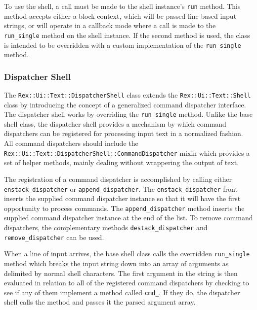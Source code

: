 \documentclass{report}
\begin{document}
\par
To use the shell, a call must be made to the shell instance's
\texttt{run} method.  This method accepts either a block context,
which will be passed line-based input strings, or will operate in a
callback mode where a call is made to the \texttt{run\_single}
method on the shell instance.  If the second method is used, the
class is intended to be overridden with a custom implementation of
the \texttt{run\_single} method.

            \subsubsection{Dispatcher Shell}

\par
The \texttt{Rex::Ui::Text::DispatcherShell} class extends the
\texttt{Rex::Ui::Text::Shell} class by introducing the concept of a
generalized command dispatcher interface.  The dispatcher shell
works by overriding the \texttt{run\_single} method.  Unlike the
base shell class, the dispatcher shell provides a mechanism by which
command dispatchers can be registered for processing input text in a
normalized fashion.  All command dispatchers should include the
\texttt{Rex::Ui::Text::DispatcherShell::CommandDispatcher} mixin
which provides a set of helper methods, mainly dealing without
wrappering the output of text.

\par
The registration of a command dispatcher is accomplished by calling
either \texttt{enstack\_dispatcher} or \texttt{append\_dispatcher}.
The \texttt{enstack\_dispatcher} front inserts the supplied command
dispatcher instance so that it will have the first opportunity to
process commands.  The \texttt{append\_dispatcher} method inserts
the supplied command dispatcher instance at the end of the list.  To
remove command dispatchers, the complementary methods
\texttt{destack\_dispatcher} and \texttt{remove\_dispatcher} can be
used.

\par
When a line of input arrives, the base shell class calls the
overridden \texttt{run\_single} method which breaks the input string
down into an array of arguments as delimited by normal shell
characters.  The first argument in the string is then evaluated in
relation to all of the registered command dispatchers by checking to
see if any of them implement a method called \texttt{cmd\_<arg 0>}.
If they do, the dispatcher shell calls the method and passes it the
parsed argument array.
\end{document}
